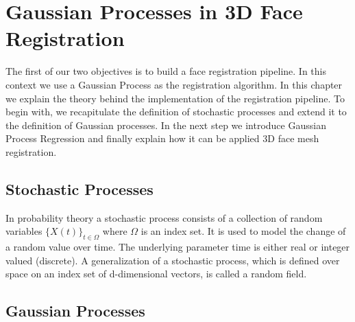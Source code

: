 \chapter{Gaussian Processes in 3D Face Registration}
The first of our two objectives is to build a face registration pipeline. In this context we use a Gaussian Process as the registration algorithm. In this chapter we explain the theory behind the implementation of the registration pipeline. To begin with, we recapitulate the definition
of stochastic processes and extend it to the definition of Gaussian processes. In the next step we introduce Gaussian Process Regression and finally explain how it can be applied 3D face mesh registration. 

\section{Stochastic Processes}

In probability theory a stochastic process consists of a collection of random variables $\{X(t)\}_{t \in \Omega}$ where $\Omega$ is an index set. It is used to model the change of a random value over time. The underlying parameter time is either real or integer valued (discrete). A generalization of a stochastic process, which is defined over space on an index set of d-dimensional vectors, is called a random field. 

\section{Gaussian Processes}

